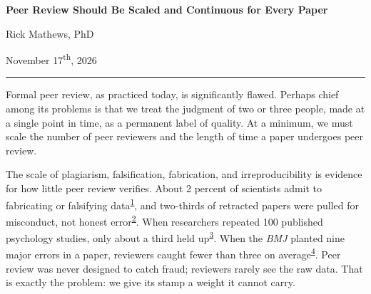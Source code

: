 \documentclass[12pt]{article}
\begin{document}
\RaggedRight
\begin{center}
  {\fontsize{21}{25.2}\selectfont\bfseries Peer Review Should Be Scaled and Continuous for Every Paper\par}
  \vspace{9pt}
  {\large Rick Mathews, PhD\par}
  \vspace{3pt}
  {\small November 17\textsuperscript{th}, 2026\par}
\end{center}
\vspace{2pt}
{\color{rule}\noindent\rule{\textwidth}{0.4pt}}\par
\vspace{-4pt}

\fontsize{13.0}{18.85}\selectfont
\setlength{\parskip}{6.5pt}
Formal peer review, as practiced today, is significantly flawed. Perhaps chief among its problems is that we treat the judgment of two or three people, made at a single point in time, as a permanent label of quality. At a minimum, we must scale the number of peer reviewers and the length of time a paper undergoes peer review.

The scale of plagiarism, falsification, fabrication, and irreproducibility is evidence for how little peer review verifies. About 2 percent of scientists admit to fabricating or falsifying data\textsuperscript{\hyperlink{ref-fanelli2009}{1}}, and two-thirds of retracted papers were pulled for misconduct, not honest error\textsuperscript{\hyperlink{ref-fang2012}{2}}. When researchers repeated 100 published psychology studies, only about a third held up\textsuperscript{\hyperlink{ref-osc2015}{3}}. When the \textit{BMJ} planted nine major errors in a paper, reviewers caught fewer than three on average\textsuperscript{\hyperlink{ref-schroter2008}{4}}. Peer review was never designed to catch fraud; reviewers rarely see the raw data. That is exactly the problem: we give its stamp a weight it cannot carry.
\end{document}
